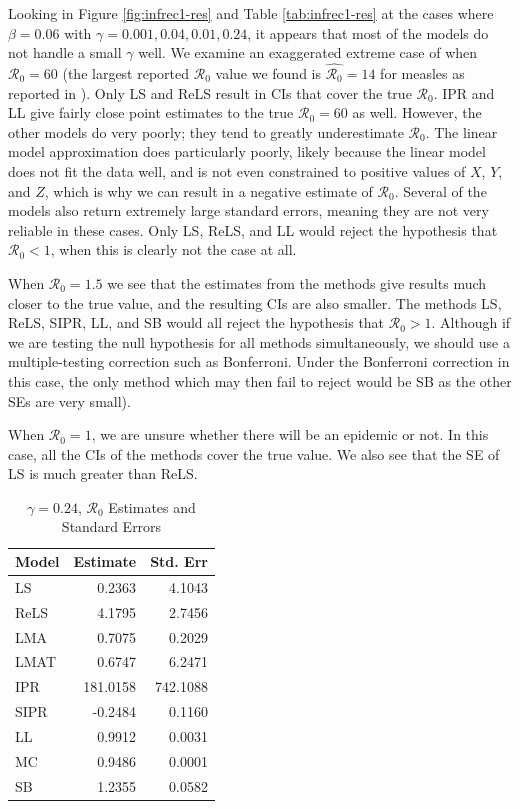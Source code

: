 \documentclass[12pt]{article}
\newcommand{\rr}{\ensuremath{\mathcal{R}_0}}
\begin{document}
Looking in Figure \ref{fig:infrec1-res} and Table \ref{tab:infrec1-res} at the cases where $\beta = 0.06$ with $\gamma = 0.001, 0.04, 0.01, 0.24$, it appears that most of the models do not handle a small $\gamma$ well.  We examine an exaggerated extreme case of when $\rr=60$ (the largest reported $\rr$ value we found is $\hat{\rr}=14$ for measles as reported in \cite{anderson1992}). Only LS and ReLS result in CIs that cover the true $\rr$. IPR and LL give fairly close point estimates to the true $\rr=60$ as well. However, the other models do very poorly; they tend to greatly underestimate $\rr$. The linear model approximation does particularly poorly, likely because the linear model does not fit the data well, and is not even constrained to positive values of $X$, $Y$, and $Z$, which is why we can result in a negative estimate of $\rr$. Several of the models also return extremely large standard errors, meaning they are not very reliable in these cases.  Only LS, ReLS, and LL would reject the hypothesis that $\rr <1$, when this is clearly not the case at all.

When $\rr=1.5$ we see that the estimates from the methods give results much closer to the true value, and the resulting CIs are also smaller.  The methods LS, ReLS, SIPR, LL, and SB would all reject the hypothesis that $\rr > 1$.  Although if we are testing the null hypothesis for  all methods simultaneously, we should use a multiple-testing correction such as Bonferroni.  Under the Bonferroni correction in this case, the only method which may then fail to reject would be SB as the other SEs are very small).

When $\rr=1$, we are unsure whether there will be an epidemic or not.  In this case, all the CIs of the methods cover the true value.  We also see that the SE of LS is much greater than ReLS.

\begin{table}[H]

	\centering
	\begin{tabular}[t]{l|r|r}
		\hline
		Model & Estimate & Std. Err\\
		\hline
		LS & 0.2363 & 4.1043 \\
		\hline
		ReLS & 4.1795 & 2.7456\\
		\hline
		LMA &  0.7075 & 0.2029 \\
		\hline
		LMAT & 0.6747 & 6.2471 \\
		\hline
		IPR & 181.0158 & 742.1088 \\
		\hline
		SIPR & -0.2484 & 0.1160 \\
		\hline
		LL & 0.9912 & 0.0031\\
		\hline
		MC & 0.9486 & 0.0001\\
		\hline
		SB & 1.2355 & 0.0582\\
		\hline
	\end{tabular}
        \caption{$\gamma = 0.24$, $\rr$ Estimates and Standard Errors}\label{tab:infrec4-res}
\end{table}
\end{document}
